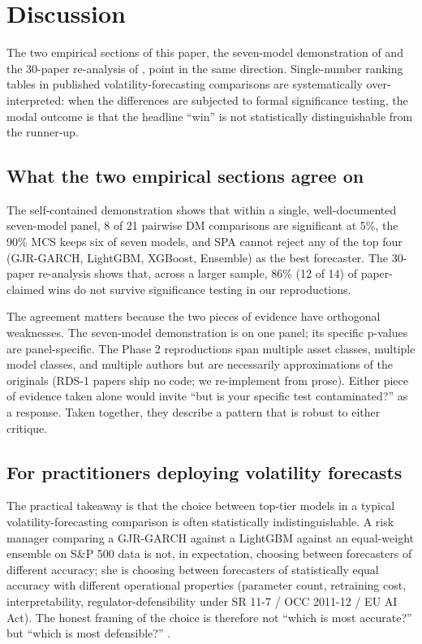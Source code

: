 \section{Discussion}\label{sec:discussion}

The two empirical sections of this paper, the seven-model demonstration of  and the 30-paper re-analysis of , point in the same direction. Single-number ranking tables in published volatility-forecasting comparisons are systematically over-interpreted: when the differences are subjected to formal significance testing, the modal outcome is that the headline ``win'' is not statistically distinguishable from the runner-up.

\subsection{What the two empirical sections agree on}

The self-contained demonstration shows that within a single, well-documented seven-model panel, 8 of 21 pairwise DM comparisons are significant at 5\%, the 90\% MCS keeps six of seven models, and SPA cannot reject any of the top four (GJR-GARCH, LightGBM, XGBoost, Ensemble) as the best forecaster. The 30-paper re-analysis shows that, across a larger sample, 86\% (12 of 14) of paper-claimed wins do not survive significance testing in our reproductions.

The agreement matters because the two pieces of evidence have orthogonal weaknesses. The seven-model demonstration is on one panel; its specific p-values are panel-specific. The Phase 2 reproductions span multiple asset classes, multiple model classes, and multiple authors but are necessarily approximations of the originals (RDS-1 papers ship no code; we re-implement from prose). Either piece of evidence taken alone would invite ``but is your specific test contaminated?'' as a response. Taken together, they describe a pattern that is robust to either critique.

\subsection{For practitioners deploying volatility forecasts}

The practical takeaway is that the choice between top-tier models in a typical volatility-forecasting comparison is often statistically indistinguishable. A risk manager comparing a GJR-GARCH against a LightGBM against an equal-weight ensemble on S\&P 500 data is not, in expectation, choosing between forecasters of different accuracy; she is choosing between forecasters of statistically equal accuracy with different operational properties (parameter count, retraining cost, interpretability, regulator-defensibility under SR 11-7 / OCC 2011-12 / EU AI Act). The honest framing of the choice is therefore not ``which is most accurate?'' but ``which is most defensible?'' \citep{FedSR117, OCC2011, EUAIAct}.

